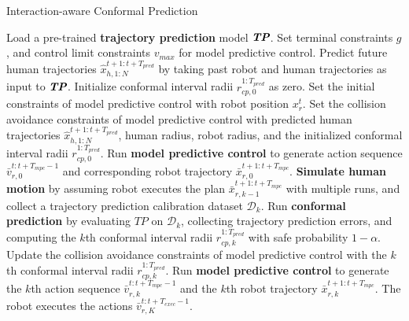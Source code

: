 \begin{algorithm}[hbt!]
    \caption{Interaction-aware Conformal Prediction}\label{algo:ICP}
    \begin{algorithmic}
    \State Load a pre-trained \textbf{trajectory prediction} model $\textit{\textbf{TP}}$.
    \State Set terminal constraints $g$, and control limit constraints $v_{max}$ for model predictive control.
        \State Predict future human trajectories $\hat{x}_{h, 1:N}^{t+1:t+T_{pred}}$ by taking past robot and human trajectories as input to $\textit{\textbf{TP}}$.
        \State Initialize conformal interval radii $r_{cp, 0}^{1:T_{pred}}$ as zero.
        \State Set the initial constraints of model predictive control with robot position $x_r^t$.
        \State Set the collision avoidance constraints of model predictive control with predicted human trajectories $\hat{x}_{h, 1:N}^{t+1:t+T_{pred}}$, human radius, robot radius, and the initialized conformal interval radii $r_{cp, 0}^{1:T_{pred}}$.
        \State Run \textbf{model predictive control} to generate action sequence $\bar{v}_{r, 0}^{t:t+T_{mpc}-1}$ and corresponding robot trajectory $\bar{x}_{r, 0}^{t+1:t+T_{mpc}}$.
            \State \textbf{Simulate human motion} by assuming robot executes the plan $\bar{x}_{r, k-1}^{t+1:t+T_{mpc}}$ with multiple runs, and collect a trajectory prediction calibration dataset $\mathcal{D}_k$.
            \State Run \textbf{conformal prediction} by evaluating $TP$ on $\mathcal{D}_k$, collecting trajectory prediction errors, and computing the $k$th conformal interval radii $r_{cp, k}^{1:T_{pred}}$ with safe probability $1-\alpha$.
            \State Update the collision avoidance constraints of model predictive control with the $k$th conformal interval radii $r_{cp, k}^{1:T_{pred}}$.
            \State Run \textbf{model predictive control} to generate the $k$th action sequence $\bar{v}_{r, k}^{t:t+T_{mpc}-1}$ and the $k$th robot trajectory $\bar{x}_{r, k}^{t+1:t+T_{mpc}}$.
        \EndFor
        \State The robot executes the actions $\bar{v}_{r, K}^{t:t+T_{exec}-1}$.
    \EndFor
 \end{algorithmic}
 \end{algorithm}
\vspace{-15pt}

